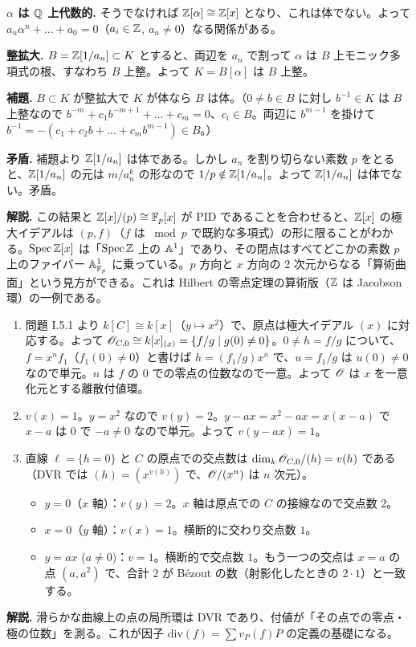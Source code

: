 \textbf{$\alpha$ は $\mathbb{Q}$ 上代数的.} そうでなければ $\mathbb{Z}[\alpha]\cong\mathbb{Z}[x]$ となり、これは体でない。よって $a_n\alpha^n+\dots+a_0=0$（$a_i\in\mathbb{Z}$, $a_n\neq0$）なる関係がある。

\textbf{整拡大.} $B=\mathbb{Z}[1/a_n]\subset K$ とすると、両辺を $a_n$ で割って $\alpha$ は $B$ 上モニック多項式の根、すなわち $B$ 上整。よって $K=B[\alpha]$ は $B$ 上整。

\textbf{補題.} $B\subset K$ が整拡大で $K$ が体なら $B$ は体。（$0\neq b\in B$ に対し $b^{-1}\in K$ は $B$ 上整なので $b^{-m}+c_1b^{-m+1}+\dots+c_m=0$、$c_i\in B$。両辺に $b^{m-1}$ を掛けて $b^{-1}=-(c_1+c_2b+\dots+c_mb^{m-1})\in B$。）

\textbf{矛盾.} 補題より $\mathbb{Z}[1/a_n]$ は体である。しかし $a_n$ を割り切らない素数 $p$ をとると、$\mathbb{Z}[1/a_n]$ の元は $m/a_n^k$ の形なので $1/p\notin\mathbb{Z}[1/a_n]$。よって $\mathbb{Z}[1/a_n]$ は体でない。矛盾。

\textbf{解説.} この結果と $\mathbb{Z}[x]/(p)\cong\mathbb{F}_p[x]$ が PID であることを合わせると、$\mathbb{Z}[x]$ の極大イデアルは $(p,f)$（$f$ は $\bmod p$ で既約な多項式）の形に限ることがわかる。$\operatorname{Spec}\mathbb{Z}[x]$ は「$\operatorname{Spec}\mathbb{Z}$ 上の $\mathbb{A}^1$」であり、その閉点はすべてどこかの素数 $p$ 上のファイバー $\mathbb{A}^1_{\mathbb{F}_p}$ に乗っている。$p$ 方向と $x$ 方向の $2$ 次元からなる「算術曲面」という見方ができる。これは Hilbert の零点定理の算術版（$\mathbb{Z}$ は Jacobson 環）の一例である。

\begin{enumerate}
  \item 問題 I.5.1 より $k[C]\cong k[x]$（$y\mapsto x^2$）で、原点は極大イデアル $(x)$ に対応する。よって $\mathscr{O}_{C,0}\cong k[x]_{(x)}=\{f/g\mid g(0)\neq0\}$。$0\neq h=f/g$ について、$f=x^nf_1$（$f_1(0)\neq0$）と書けば $h=(f_1/g)x^n$ で、$u=f_1/g$ は $u(0)\neq0$ なので単元。$n$ は $f$ の $0$ での零点の位数なので一意。よって $\mathscr{O}$ は $x$ を一意化元とする離散付値環。
  \item $v(x)=1$。$y=x^2$ なので $v(y)=2$。$y-ax=x^2-ax=x(x-a)$ で $x-a$ は $0$ で $-a\neq0$ なので単元。よって $v(y-ax)=1$。
  \item 直線 $\ell=\{h=0\}$ と $C$ の原点での交点数は $\dim_k\mathscr{O}_{C,0}/(h)=v(h)$ である（DVR では $(h)=(x^{v(h)})$ で、$\mathscr{O}/(x^n)$ は $n$ 次元）。
  \begin{itemize}
    \item $y=0$（$x$ 軸）：$v(y)=2$。$x$ 軸は原点での $C$ の接線なので交点数 $2$。
    \item $x=0$（$y$ 軸）：$v(x)=1$。横断的に交わり交点数 $1$。
    \item $y=ax$ ($a\neq0$)：$v=1$。横断的で交点数 $1$。もう一つの交点は $x=a$ の点 $(a,a^2)$ で、合計 $2$ が Bézout の数（射影化したときの $2\cdot1$）と一致する。
  \end{itemize}
\end{enumerate}
\textbf{解説.} 滑らかな曲線上の点の局所環は DVR であり、付値が「その点での零点・極の位数」を測る。これが因子 $\mathrm{div}(f)=\sum v_P(f)P$ の定義の基礎になる。

